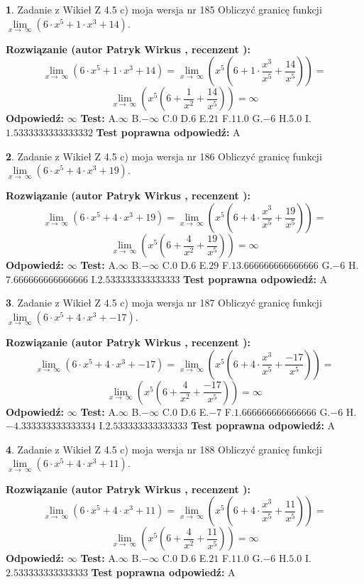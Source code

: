 \documentclass[12pt, a4paper]{article}
\theoremstyle{definition} %
\newtheorem{zad}{}
\newcommand{\zadStart}[1]{\begin{zad}#1\newline}
\newcommand{\zadStop}{\end{zad}}
\newcommand{\rozwStart}[2]{\noindent \textbf{Rozwiązanie (autor #1 , recenzent #2): }\newline}
\newcommand{\rozwStop}{\newline}
\newcommand{\odpStart}{\noindent \textbf{Odpowiedź:}\newline}
\newcommand{\odpStop}{\newline}
\newcommand{\testStart}{\noindent \textbf{Test:}\newline}
\newcommand{\testStop}{\newline}
\newcommand{\kluczStart}{\noindent \textbf{Test poprawna odpowiedź:}\newline}
\newcommand{\kluczStop}{\newline}
\begin{document}
\zadStart{Zadanie z Wikieł Z 4.5 c) moja wersja nr 185}
Obliczyć granicę funkcji  $\lim\limits_{x\to\ \infty}(6 \cdot x^{5}+1 \cdot x^{3}+14)$.
\zadStop
\rozwStart{Patryk Wirkus}{}
$$\lim\limits_{x\to\ \infty}(6 \cdot x^{5}+1 \cdot x^{3}+14) = \lim\limits_{x\to\ \infty}(x^{5}(6 +1 \cdot \frac{x^{3}}{x^{5}}+\frac{14}{x^{5}})) =$$ $$\lim\limits_{x\to\ \infty}(x^{5}(6 +\frac{1}{x^{2}}+\frac{14}{x^{5}})) =\infty$$
\rozwStop
\odpStart
$\infty$
\odpStop
\testStart
A.$\infty$ B.$-\infty$ C.$0$ D.$6$ E.$21$
F.$11.0$ G.$-6$
H.$5.0$
I.$1.5333333333333332$
\testStop
\kluczStart
A
\kluczStop



\zadStart{Zadanie z Wikieł Z 4.5 c) moja wersja nr 186}
Obliczyć granicę funkcji  $\lim\limits_{x\to\ \infty}(6 \cdot x^{5}+4 \cdot x^{3}+19)$.
\zadStop
\rozwStart{Patryk Wirkus}{}
$$\lim\limits_{x\to\ \infty}(6 \cdot x^{5}+4 \cdot x^{3}+19) = \lim\limits_{x\to\ \infty}(x^{5}(6 +4 \cdot \frac{x^{3}}{x^{5}}+\frac{19}{x^{5}})) =$$ $$\lim\limits_{x\to\ \infty}(x^{5}(6 +\frac{4}{x^{2}}+\frac{19}{x^{5}})) =\infty$$
\rozwStop
\odpStart
$\infty$
\odpStop
\testStart
A.$\infty$ B.$-\infty$ C.$0$ D.$6$ E.$29$
F.$13.666666666666666$ G.$-6$
H.$7.666666666666666$
I.$2.533333333333333$
\testStop
\kluczStart
A
\kluczStop



\zadStart{Zadanie z Wikieł Z 4.5 c) moja wersja nr 187}
Obliczyć granicę funkcji  $\lim\limits_{x\to\ \infty}(6 \cdot x^{5}+4 \cdot x^{3}+-17)$.
\zadStop
\rozwStart{Patryk Wirkus}{}
$$\lim\limits_{x\to\ \infty}(6 \cdot x^{5}+4 \cdot x^{3}+-17) = \lim\limits_{x\to\ \infty}(x^{5}(6 +4 \cdot \frac{x^{3}}{x^{5}}+\frac{-17}{x^{5}})) =$$ $$\lim\limits_{x\to\ \infty}(x^{5}(6 +\frac{4}{x^{2}}+\frac{-17}{x^{5}})) =\infty$$
\rozwStop
\odpStart
$\infty$
\odpStop
\testStart
A.$\infty$ B.$-\infty$ C.$0$ D.$6$ E.$-7$
F.$1.666666666666666$ G.$-6$
H.$-4.333333333333334$
I.$2.533333333333333$
\testStop
\kluczStart
A
\kluczStop



\zadStart{Zadanie z Wikieł Z 4.5 c) moja wersja nr 188}
Obliczyć granicę funkcji  $\lim\limits_{x\to\ \infty}(6 \cdot x^{5}+4 \cdot x^{3}+11)$.
\zadStop
\rozwStart{Patryk Wirkus}{}
$$\lim\limits_{x\to\ \infty}(6 \cdot x^{5}+4 \cdot x^{3}+11) = \lim\limits_{x\to\ \infty}(x^{5}(6 +4 \cdot \frac{x^{3}}{x^{5}}+\frac{11}{x^{5}})) =$$ $$\lim\limits_{x\to\ \infty}(x^{5}(6 +\frac{4}{x^{2}}+\frac{11}{x^{5}})) =\infty$$
\rozwStop
\odpStart
$\infty$
\odpStop
\testStart
A.$\infty$ B.$-\infty$ C.$0$ D.$6$ E.$21$
F.$11.0$ G.$-6$
H.$5.0$
I.$2.533333333333333$
\testStop
\kluczStart
A
\kluczStop
\end{document}
